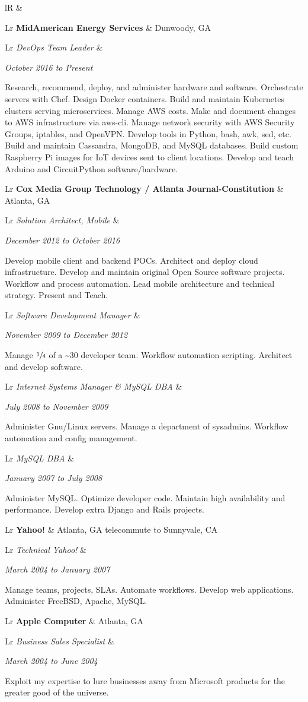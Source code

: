 \documentclass[letterpaper,10pt]{article}
\newcommand{\sizeF}[0]{\fontsize{11pt}{13pt}\selectfont}
\newcounter{skipfirstcounter}
\newcommand{\skipfirst}[1]{
    \ifthenelse{\equal{\value{skipfirstcounter}}{0}}{#1}{#1}
	\addtocounter{skipfirstcounter}{1}
}
\newcommand{\blocktitle}[1]{
	\setcounter{skipfirstcounter}{0}
    \begin{tabularx}{\textwidth}{lR}
        {\sizeF\sc{#1}} & \noindent\hrulefill\\
    \end{tabularx}
}
\newcommand{\blockExperience}[1]{
    \blocktitle{Career}%
    #1%
	\vspace{2mm}%
}
\newcommand{\sectionheaderfirst}[2]{
    \begin{tabularx}{\textwidth}{Lr}%
    \textbf{#1} & #2\\%
    \end{tabularx}%
}
\newcommand{\sectionheader}[2]{
	\vspace{2mm}%
	\sectionheaderfirst{#1}{#2}%
}
\newcommand{\sectionsub}[2]{
    {\def\arraystretch{1}
        \begin{tabularx}{\textwidth}{Lr}
        \rowcolor[rgb]{.9,.9,.9}
        \emph{#1} &
        \rule{0mm}{3.2mm} %
        \emph{#2} \\
        \addlinespace[0.4mm]
        \end{tabularx}
    }
}
\newcommand{\sectionbody}[1]{
    #1
    \vspace{1mm}
}
\begin{document}
\blockExperience{
	\sectionheaderfirst
	{MidAmerican Energy Services}{Dunwoody, GA}
	\sectionsub
	{DevOps Team Leader}
	{October 2016 to Present}
	\sectionbody{
	Research, recommend, deploy, and administer hardware and software.
	Orchestrate servers with Chef.
	Design Docker containers.
	Build and maintain Kubernetes clusters serving microservices.
	Manage AWS costs.
	Make and document changes to AWS infrastructure via aws-cli.
	Manage network security with AWS Security Groups, iptables, and OpenVPN.
	Develop tools in Python, bash, awk, sed, etc.
	Build and maintain Cassandra, MongoDB, and MySQL databases.
	Build custom Raspberry Pi images for IoT devices sent to client locations.
	Develop and teach Arduino and CircuitPython software/hardware.
	}

	\sectionheader
	{Cox Media Group Technology / Atlanta Journal-Constitution}{Atlanta, GA}
	\sectionsub
	{Solution Architect, Mobile}
	{December 2012 to October 2016}
	\sectionbody{
	Develop mobile client and backend POCs.
	Architect and deploy cloud infrastructure.
	Develop and maintain original Open Source software projects.
	Workflow and process automation.
	Lead mobile architecture and technical strategy.
	Present and Teach.
	}

	\sectionsub
	{Software Development Manager}
	{November 2009 to December 2012}
	\sectionbody{
	Manage $\sfrac{1}{4}$ of a \~{}30 developer team.
	Workflow automation scripting.
	Architect and develop software.
	}

	\sectionsub
	{Internet Systems Manager \& MySQL DBA}
	{July 2008 to November 2009}
	\sectionbody{
	Administer Gnu/Linux servers.
	Manage a department of sysadmins.
	Workflow automation and config management.
	}

	\sectionsub
	{MySQL DBA}
	{January 2007 to July 2008}
	\sectionbody{
	Administer MySQL.
	Optimize developer code.
	Maintain high availability and performance.
	Develop extra Django and Rails projects.
	}

	\sectionheader
	{Yahoo!}{Atlanta, GA telecommute to Sunnyvale, CA}
	\sectionsub
	{Technical Yahoo!}
	{March 2004 to January 2007}
	\sectionbody{
	Manage teams, projects, SLAs.
	Automate workflows.
	Develop web applications.
	Administer FreeBSD, Apache, MySQL.
	}

	\sectionheader
	{Apple Computer}{Atlanta, GA}
	\sectionsub
	{Business Sales Specialist}
	{March 2004 to June 2004}
	\sectionbody{
	Exploit my expertise to lure businesses away from Microsoft products for the greater good of the universe.
	}

}
\end{document}
